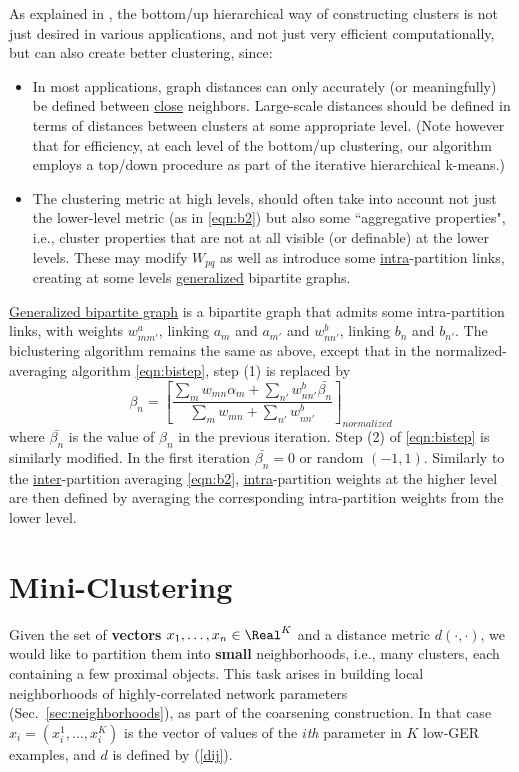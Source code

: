 \documentclass{article} %
\begin{document}
As explained in \cite{RSB}, the bottom/up hierarchical way of constructing clusters is not just desired in various applications, and not just very efficient computationally, but can also create better clustering, since:

\begin{itemize}
\item
In most applications, graph distances can only accurately (or meaningfully) be defined between \underline{close} neighbors. Large-scale distances should be defined in terms of distances between clusters at some appropriate level. (Note however that for efficiency, at each level of the bottom/up clustering, our algorithm employs a top/down procedure as part of the iterative hierarchical k-means.)
\item
The clustering metric at high levels, should often take into account not just the lower-level metric (as in \eqref{eqn:b2}) but also some ``aggregative properties", i.e., cluster properties that are not at all visible (or definable) at the lower levels. These may modify $W_{pq}$ as well as introduce some \underline{intra}-partition links, creating at some levels \underline{generalized} bipartite graphs.
\end{itemize}

\underline{Generalized bipartite graph} is a bipartite graph that admits some intra-partition links, with weights $w^a_{mm'}$, linking $a_m$ and $a_{m'}$ and $w^b_{nn'}$, linking $b_n$ and $b_{n'}$. The biclustering algorithm remains the same as above, except that in the normalized-averaging algorithm \eqref{eqn:bistep}, step (1) is replaced by
\begin{equation}
\beta_n = \left[ \frac{\sum_m w_{mn} \alpha_m + \sum_{n'} w_{nn'}^b \bar{\beta_n}}
{\sum_m w_{mn} + \sum_{n'} w_{nn'}^b} \right]_{normalized} 
\end{equation}
where $\bar{\beta_n}$ is the value of $\beta_n$ in the previous iteration. Step (2) of \eqref{eqn:bistep} is similarly modified. In the first iteration $\bar{\beta_n}=0$ or random $(-1,1)$. Similarly to the 
\underline{inter}-partition averaging \eqref{eqn:b2}, \underline{intra}-partition weights at the higher level are then defined by averaging the corresponding intra-partition weights from the lower level.

\section{Mini-Clustering}
\label{sparse_linkage_clustering}
Given the set of \textbf{vectors} $x_1, \dots, x_n \in \Real^K$ and a distance metric $d(\cdot, \cdot)$, we would like to partition them into \textbf{small} neighborhoods, i.e., many clusters, each containing a few proximal objects. This task arises in building local neighborhoods of highly-correlated network parameters (Sec.~\ref{sec:neighborhoods}), as part of the coarsening construction. In that case $x_i=(x^1_i,\dots,x^K_i)$ is the vector of values of the $i${\it th} parameter in $K$ low-GER examples, and $d$ is defined by (\ref{dij}).
\end{document}
